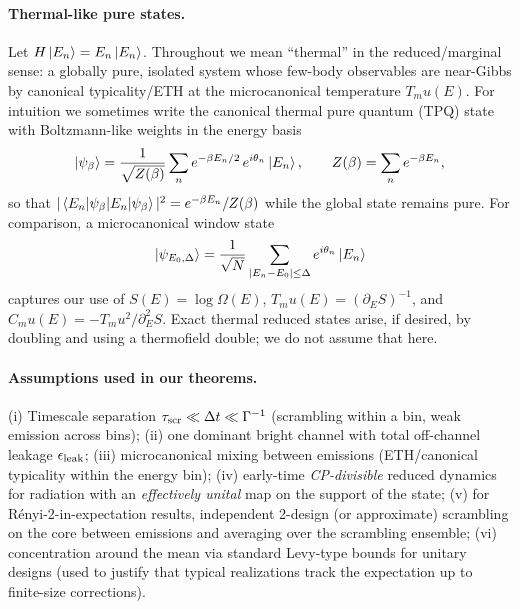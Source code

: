 \documentclass[aps,prx,onecolumn,showpacs,superscriptaddress,longbibliography,nofootinbib]{revtex4-2}
\def\mu{mu}%
\begin{document}
\paragraph*{Thermal-like pure states.}
Let $H\ket{E_n}=E_n\ket{E_n}$. Throughout we mean ``thermal'' in the reduced/marginal sense: a globally pure, isolated system whose few-body observables are near-Gibbs by canonical typicality/ETH at the microcanonical temperature $T_\mu(E)$. For intuition we sometimes write the canonical thermal pure quantum (TPQ) state with Boltzmann-like weights in the energy basis
\begin{equation}
\ket{\psi_\beta}=\frac{1}{\sqrt{Z(\beta)}}\sum_n e^{-\beta E_n/2}\,e^{i\theta_n}\ket{E_n},\qquad Z(\beta)=\sum_n e^{-\beta E_n},
\end{equation}
so that $|\braket{E_n|\psi_\beta}|^2=e^{-\beta E_n}/Z(\beta)$ while the global state remains pure. For comparison, a microcanonical window state
\begin{equation}
\ket{\psi_{E_0,\Delta}}=\frac{1}{\sqrt{N}}\sum_{|E_n-E_0|\le \Delta} e^{i\theta_n}\ket{E_n}
\end{equation}
captures our use of $S(E)=\log\Omega(E)$, $T_\mu(E)=(\partial_E S)^{-1}$, and $C_\mu(E)=-T_\mu^2/\partial_E^2 S$. Exact thermal reduced states arise, if desired, by doubling and using a thermofield double; we do not assume that here.

\paragraph*{Assumptions used in our theorems.}
(i) Timescale separation $\tau_{\rm scr}\ll\Delta t\ll\Gamma^{-1}$ (scrambling within a bin, weak emission across bins); (ii) one dominant bright channel with total off-channel leakage $\epsilon_{\rm leak}$; (iii) microcanonical mixing between emissions (ETH/canonical typicality within the energy bin); (iv) early-time \emph{CP-divisible} reduced dynamics for radiation with an \emph{effectively unital} map on the support of the state; (v) for R\'enyi-2-in-expectation results, independent 2-design (or approximate) scrambling on the core between emissions and averaging over the scrambling ensemble; (vi) concentration around the mean via standard Levy-type bounds for unitary designs (used to justify that typical realizations track the expectation up to finite-size corrections).
\end{document}
